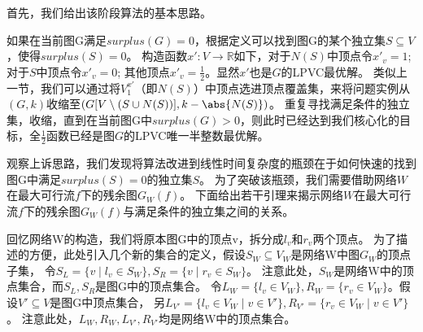 首先，我们给出该阶段算法的基本思路。

如果在当前图G满足$surplus(G) = 0$，根据定义可以找到图G的某个独立集$S \subseteq V$，使得$surplus(S) = 0$。
构造函数$x':V \rightarrow \mathbb{R}$如下，对于$N(S)$中顶点令$x'_v = 1$; 对于$S$中顶点令$x'_v = 0$; 其他顶点$x'_v = \frac{1}{2}$。显然$x'$也是$G$的LPVC最优解。
类似上一节，我们可以通过将$V^{x'}_1$（即$N(S)$）中顶点选进顶点覆盖集，来将问题实例从$(G,k)$收缩至$(G[V\setminus(S \cup N(S))], k - \abs{N(S)})$。
重复寻找满足条件的独立集，收缩，直到在当前图G中$surplus(G) > 0$，则此时已经达到我们核心化的目标，全$\frac{1}{2}$函数已经是图$G$的LPVC唯一半整数最优解。

观察上诉思路，我们发现将算法改进到线性时间复杂度的瓶颈在于如何快速的找到图G中满足$surplus(S) = 0$的独立集$S$。
为了突破该瓶颈，我们需要借助网络$W$在最大可行流$f$下的残余图$G_W(f)$。
下面给出若干引理来揭示网络$W$在最大可行流$f$下的残余图$G_W(f)$与满足条件的独立集之间的关系。

回忆网络W的构造，我们将原本图G中的顶点v，拆分成$l_v$和$r_v$两个顶点。
为了描述的方便，此处引入几个新的集合的定义，假设$S_W \subseteq V_W$是网络W中图$G_W$的顶点子集，
令$S_L = \{v\;|\;l_v \in S_W\},S_R = \{v\;|\;r_v \in S_W\}$。
注意此处，$S_W$是网络W中的顶点集合，而$S_L, S_R$是图G中的顶点集合。
令$L_W = \{l_v \in V_W\}, R_W = \{r_v \in V_W\}$。假设$V' \subseteq V$是图G中顶点集合，
另$L_{V'} = \{l_v\in V_W\;|\;v \in V'\},R_{V'} = \{r_v\in V_W\;|\;v \in V'\}$。
注意此处，$L_W, R_W, L_{V'}, R_{V'}$均是网络W中的顶点集合。


